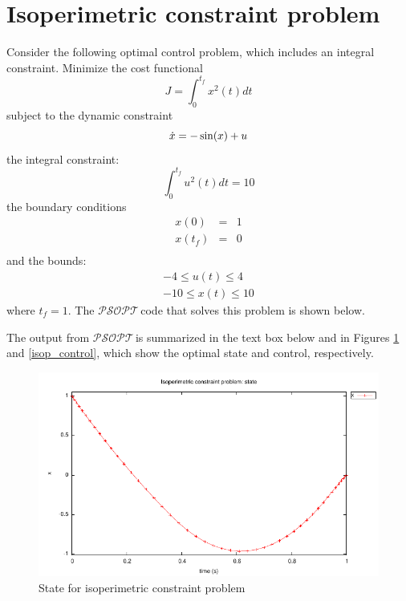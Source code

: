 \documentclass[a4paper,11pt]{report}    %
\newcommand{\psopt}{$\mathcal{PSOPT}$\,}  %
\newenvironment{shadedframe}{%
  \def\FrameCommand{\fcolorbox{black}{shadecolor}}%
  \MakeFramed {\FrameRestore}}
{\endMakeFramed}
\begin{document}
\section{Isoperimetric constraint problem}

Consider the following optimal control problem, which includes an integral constraint.
Minimize the cost functional
\begin{equation}
  J =  \int_0^{t_f}  x^2(t)  dt
\end{equation}
subject to the dynamic constraint
\begin{equation}
    \dot x  =  -\sin(x) + u \\
\end{equation}
the integral constraint:
\begin{equation}
   \int_0^{t_f}   u^2(t)  dt = 10
\end{equation}
the boundary conditions
\begin{equation}
  \begin{array}{lcl}
    x(0) & = & 1 \\
    x(t_f) & = & 0 \\
  \end{array}
\end{equation}
and the bounds:
\begin{equation}
  \begin{aligned}
     -4 \le u(t) \le 4 \\
     -10 \le x(t) \le 10
  \end{aligned}
\end{equation}
where $t_f=1$. The
\psopt code that solves this problem is shown below.  

\tiny
\begin{shadedframe}

\end{shadedframe}
\normalsize
The output from \psopt is summarized in the text box below and in Figures
\ref{isop_state} and \ref{isop_control}, which show the optimal state and control, respectively.

\small
\begin{shadedframe}

\end{shadedframe}
\normalsize

\begin{figure}
  \centering
  \includegraphics{../examples/isop/isop_state}
  \caption{State for isoperimetric constraint problem}
  \label{isop_state}
\end{figure}
\end{document}

